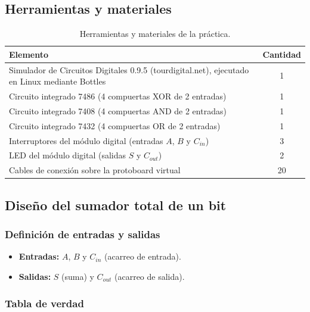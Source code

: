 \documentclass[10pt]{article}
\begin{document}
\subsection{Herramientas y materiales}

\begin{table}[!htbp]
  \centering
  \caption{Herramientas y materiales de la práctica.}
  \label{tab:materiales}
  \begin{tabular}{p{7cm}c}
    \toprule
    Elemento & Cantidad \\
    \midrule
    Simulador de Circuitos Digitales 0.9.5 (tourdigital.net), ejecutado en Linux mediante Bottles & 1 \\
    Circuito integrado 7486 (4 compuertas XOR de 2 entradas) & 1 \\
    Circuito integrado 7408 (4 compuertas AND de 2 entradas) & 1 \\
    Circuito integrado 7432 (4 compuertas OR de 2 entradas)  & 1 \\
    Interruptores del módulo digital (entradas $A$, $B$ y $C_{in}$) & 3 \\
    LED del módulo digital (salidas $S$ y $C_{out}$) & 2 \\
    Cables de conexión sobre la protoboard virtual & 20 \\
    \bottomrule
  \end{tabular}
\end{table}

\subsection{Diseño del sumador total de un bit}

\subsubsection{Definición de entradas y salidas}

\begin{itemize}
  \item \textbf{Entradas:} $A$, $B$ y $C_{in}$ (acarreo de entrada).
  \item \textbf{Salidas:} $S$ (suma) y $C_{out}$ (acarreo de salida).
\end{itemize}

\subsubsection{Tabla de verdad}
\end{document}
